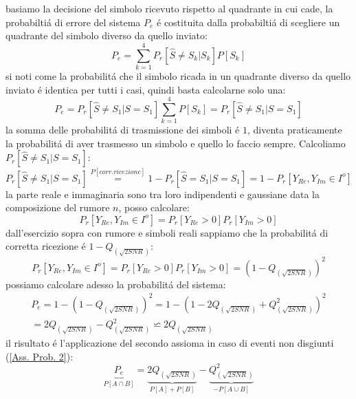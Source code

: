                 basiamo la decisione del simbolo ricevuto rispetto al quadrante in cui cade, la probabiltiá di errore del 
                sistema $P_e$ é costituita dalla probabiltiá di scegliere un quadrante del simbolo diverso da quello inviato:
                \[
                    P_e = \sum_{k=1}^{4} P_r[\hat{S} \neq S_k | S_k]P[S_k]
                \]
                si noti come la probabilitá che il simbolo ricada in un quadrante diverso da quello inviato é identica per tutti i casi, 
                quindi basta calcolarne solo una: 
                \[
                    P_e = P_r[\hat{S} \neq S_1 | S=S_1]\sum_{k=1}^{4} P[S_k] = P_r[\hat{S} \neq S_1 | S=S_1]
                \]
                la somma delle probabilitá di trasmissione dei simboli é $1$, diventa praticamente la probabilitá di aver trasmesso un simbolo e quello lo faccio sempre.
                Calcoliamo $P_r[\hat{S} \neq S_1 | S=S_1]$:
                \[
                    P_r[\hat{S} \neq S_1 | S=S_1] \overset{P[corr. ricezione]}{=} 1-P_r[\hat{S} = S_1 | S=S_1] = 1-P_r[Y_{Re},Y_{Im} \in I^o ] 
                \]
                la parte reale e immaginaria sono tra loro indipendenti e gaussiane data la composizione del rumore $n$, posso calcolare:
                \[
                    P_r[Y_{Re},Y_{Im} \in I^o ] = P_r[Y_{Re}>0]P_r[Y_{Im}>0] 
                \]
                dall'esercizio sopra con rumore e simboli reali sappiamo che la probabilitá di corretta ricezione é $1-Q_{(\sqrt{2SNR})}$:
                \[
                    P_r[Y_{Re},Y_{Im} \in I^o ] = P_r[Y_{Re}>0]P_r[Y_{Im}>0] = \left(1-Q_{(\sqrt{2SNR})}\right)^2
                \]
                possiamo calcolare adesso la probabilitá del sistema:
                \begin{gather}
                    P_e = 1-\left(1-Q_{(\sqrt{2SNR})}\right)^2 =1-\left(1-2Q_{(\sqrt{2SNR})}+Q^2_{(\sqrt{2SNR})}\right)^2  \nonumber\\
                        = 2Q_{(\sqrt{2SNR})}-Q^2_{(\sqrt{2SNR})} \backsimeq 2Q_{(\sqrt{2SNR})}\nonumber
                \end{gather}
                il risultato é l'applicazione del secondo assioma in caso di eventi non disgiunti (\ref{Ass. Prob. 2}):
                \[    
                    \underset{P[A\cap B]}{\underbrace{P_e }}=\underset{P[A]+P[B]}{\underbrace{2Q_{(\sqrt{2SNR})}}}-\underset{-P[A\cup B]}{\underbrace{Q^2_{(\sqrt{2SNR})}}} 
                \]
                
          
    